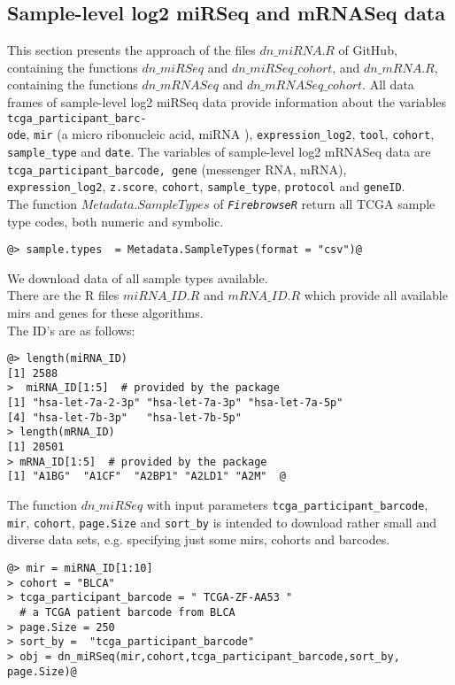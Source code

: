 \documentclass{TechReport}
\begin{document}
\subsection{Sample-level log2 miRSeq and mRNASeq data}
This section presents the approach of the files $dn\_miRNA.R$ of GitHub, containing
the functions $dn\_miRSeq$ and $dn\_miRSeq\_cohort$, and $dn\_mRNA.R$, 
containing the functions $dn\_mRNASeq$ and $dn\_mRNASeq\_cohort$. All data frames of
sample-level log2 miRSeq data provide information about the 
variables {\tt tcga\_participant\_barc-\\ ode}, {\tt mir} (a micro ribonucleic acid,
miRNA ), {\tt expression\_log2}, {\tt tool}, {\tt cohort}, {\tt sample\_type} and
{\tt date}. The variables of sample-level log2 
mRNASeq data are {\tt tcga\_participant\_barcode, gene} (messenger RNA, mRNA), {\tt
expression\_log2}, {\tt z.score}, {\tt cohort}, {\tt sample\_type}, 
{\tt protocol} and {\tt geneID}.\\
The function $Metadata.SampleTypes$ of \texttt{\em FirebrowseR} return all TCGA
sample type codes, both numeric and symbolic.
\begin{lstlisting}[style=base]
@> sample.types  = Metadata.SampleTypes(format = "csv")@
 \end{lstlisting}
We download data of all sample types available.\\
There are the R files $miRNA\_ID.R$ and $mRNA\_ID.R$ which provide all available
mirs and genes for these algorithms.\\
The ID's are as follows:
\begin{lstlisting}[style=base]
@> length(miRNA_ID)
[1] 2588
>  miRNA_ID[1:5]  # provided by the package
[1] "hsa-let-7a-2-3p" "hsa-let-7a-3p" "hsa-let-7a-5p" 
[4] "hsa-let-7b-3p"   "hsa-let-7b-5p"         
> length(mRNA_ID)
[1] 20501
> mRNA_ID[1:5]  # provided by the package
[1] "A1BG"  "A1CF"  "A2BP1" "A2LD1" "A2M"  @
\end{lstlisting}
The function $dn\_miRSeq$ with input parameters  {\tt tcga\_participant\_barcode},
{\tt mir}, {\tt cohort}, {\tt page.Size} and {\tt sort\_by} is intended to download 
rather small and diverse data sets, e.g. specifying just some mirs, cohorts and
barcodes.
\begin{lstlisting}[style=base]
@> mir = miRNA_ID[1:10]
> cohort = "BLCA"
> tcga_participant_barcode = " TCGA-ZF-AA53 "  
  # a TCGA patient barcode from BLCA
> page.Size = 250 
> sort_by =  "tcga_participant_barcode"
> obj = dn_miRSeq(mir,cohort,tcga_participant_barcode,sort_by, 
page.Size)@
\end{lstlisting}
\end{document}
